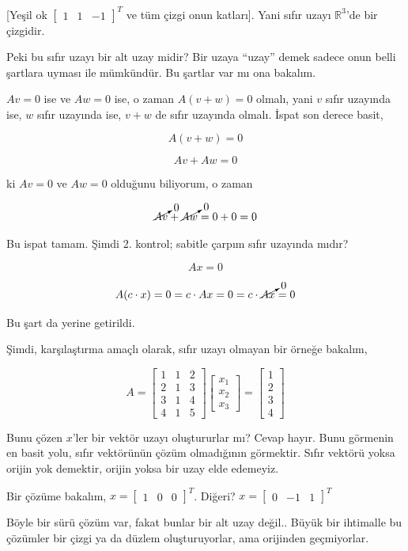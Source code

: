 \documentclass[12pt,fleqn]{article}\usepackage{../../common}
\begin{document}
[Yeşil ok $\left[\begin{array}{rrr}1 & 1 & -1\end{array}\right]^T$ ve tüm
çizgi onun katları]. Yani sıfır uzayı $\mathbb{R}^3$'de bir çizgidir. 

Peki bu sıfır uzayı bir alt uzay midir? Bir uzaya ``uzay'' demek sadece
onun belli şartlara uyması ile mümkündür. Bu şartlar var mı ona bakalım.

$Av=0$ ise ve $Aw=0$ ise, o zaman $A(v+w)=0$ olmalı, yani $v$ sıfır
uzayında ise, $w$ sıfır uzayında ise, $v+w$ de sıfır uzayında olmalı. İspat
son derece basit, 

$$ A(v+w) = 0 $$

$$ Av + Aw = 0 $$

ki $Av=0$ ve $Aw=0$ olduğunu biliyorum, o zaman 

$$ \cancelto{0}{Av} + \cancelto{0}{Aw} = 0 + 0 = 0 $$

Bu ispat tamam. Şimdi 2. kontrol; sabitle çarpım sıfır uzayında mıdır? 

$$ Ax = 0  $$

$$ A(c \cdot x) = 0  = c \cdot Ax = 0 = c \cdot \cancelto{0}{Ax} = 0$$

Bu şart da yerine getirildi. 

Şimdi, karşılaştırma amaçlı olarak, sıfır uzayı olmayan bir örneğe bakalım,

$$ A = 
\left[\begin{array}{rrr}
1 & 1 & 2 \\
2 & 1 & 3 \\
3 & 1 & 4 \\
4 & 1 & 5 
\end{array}\right]
\left[\begin{array}{r}
x_1  \\
x_2  \\
x_3  
\end{array}\right] 
=
\left[\begin{array}{r}
1  \\
2  \\
3  \\
4  
\end{array}\right]
 $$

Bunu çözen $x$'ler bir vektör uzayı oluştururlar mı? Cevap hayır. Bunu
görmenin en basit yolu, sıfır vektörünün çözüm olmadığının
görmektir. Sıfır vektörü yoksa orijin yok demektir, orijin yoksa bir uzay
elde edemeyiz. 

Bir çözüme bakalım, $x = \left[\begin{array}{rrr} 1&0&0 \end{array}\right]^T$. 
Diğeri?  $x = \left[\begin{array}{rrr} 0&-1&1 \end{array}\right]^T$

Böyle bir sürü çözüm var, fakat bunlar bir alt uzay değil.. Büyük bir
ihtimalle bu çözümler bir çizgi ya da düzlem oluşturuyorlar, ama orijinden 
geçmiyorlar. 
\end{document}
